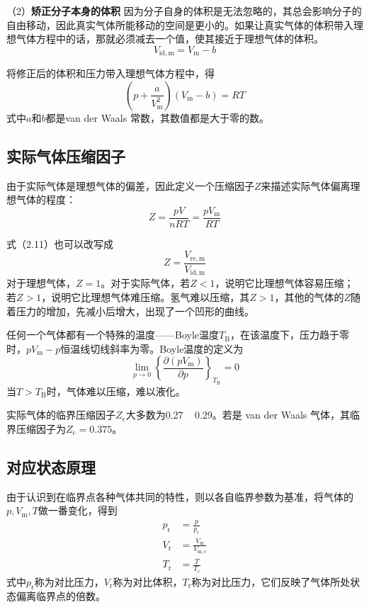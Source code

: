\documentclass[lang=cn,newtx,10pt,scheme=chinese]{elegantbook}
\begin{document}
（2）\textbf{矫正分子本身的体积} \quad 因为分子自身的体积是无法忽略的，其总会影响分子的自由移动，因此真实气体所能移动的空间是更小的。如果让真实气体的体积带入理想气体方程中的话，那就必须减去一个值，使其接近于理想气体的体积。
\begin{equation}
	V_{\mathrm{id, m}} = V_{\mathrm{m}}-b
\end{equation}

将修正后的体积和压力带入理想气体方程中，得
\begin{equation}
	\left ( p+\frac{a}{V^2_\mathrm{m} }  \right )\left ( V_\mathrm{m}-b  \right )  =RT
\end{equation}
式中$a$和$b$都是van der Waals 常数，其数值都是大于零的数。

\subsection{实际气体压缩因子}
由于实际气体是理想气体的偏差，因此定义一个压缩因子$Z$来描述实际气体偏离理想气体的程度：
\begin{equation}
	Z = \frac{pV}{nRT}=\frac{pV_{\mathrm{m}}}{RT}
\end{equation}

式（2.11）也可以改写成
\begin{equation}
	Z = \frac{V_\mathrm{re,m}}{V_\mathrm{id,m}}
\end{equation}
对于理想气体，$Z=1$。对于实际气体，若$Z<1$，说明它比理想气体容易压缩；若$Z>1$，说明它比理想气体难压缩。氢气难以压缩，其$Z>1$，其他的气体的$Z$随着压力的增加，先减小后增大，出现了一个凹形的曲线。

任何一个气体都有一个特殊的温度——Boyle温度$T_\mathrm{B}$，在该温度下，压力趋于零时，$pV_\mathrm{m}-p$恒温线切线斜率为零。Boyle温度的定义为
\begin{equation}
	\lim_{p \to 0} \left \{ \frac{\partial (pV_\mathrm{m} )}{\partial p}  \right \}_{T_\mathrm{B} }=0
\end{equation}
当$T>T_\mathrm{B}$时，气体难以压缩，难以液化。

实际气体的临界压缩因子$Z_\mathrm{c}$大多数为0.27 ~ 0.29。若是 van der Waals 气体，其临界压缩因子为$Z_\mathrm{c}=0.375$。

\subsection{对应状态原理}
由于认识到在临界点各种气体共同的特性，则以各自临界参数为基准，将气体的$p,V_\mathrm{m},T$做一番变化，得到
\begin{equation}
	\begin{aligned}
		p_\mathrm{r} &= \frac{p}{p_\mathrm{c}} \\[1.5ex]
		V_\mathrm{r} &= \frac{V_\mathrm{m}}{V_\mathrm{m,c}} \\[1.5ex]
		T_\mathrm{r} &= \frac{T}{T_\mathrm{c}} 
	\end{aligned}
\end{equation}
式中$p_\mathrm{r}$称为对比压力，$V_\mathrm{r}$称为对比体积，$T_\mathrm{r}$称为对比压力，它们反映了气体所处状态偏离临界点的倍数。
\end{document}
